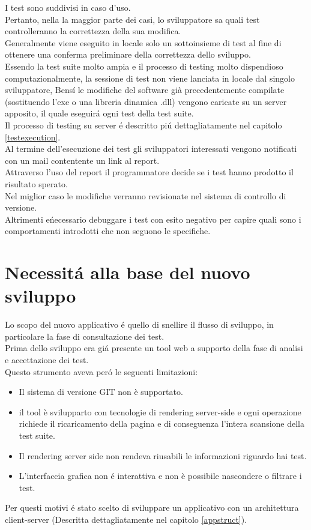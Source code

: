         I test sono suddivisi in caso d'uso.\\
        Pertanto, nella la maggior parte dei casi, lo sviluppatore sa quali test  controlleranno la correttezza della sua modifica.\\
        Generalmente viene eseguito in locale solo un sottoinsieme di test al fine di ottenere una conferma preliminare della correttezza dello sviluppo.\\

        Essendo la test suite molto ampia e il processo di testing molto dispendioso computazionalmente, 
        la sessione di test non viene lanciata in locale dal singolo sviluppatore, 
        Bens\'i  le modifiche del software già precedentemente compilate (sostituendo l’exe o una libreria dinamica .dll) 
        vengono caricate su un server apposito, il quale eseguir\'a ogni test della test suite.\\

        Il processo di testing su server \'e descritto pi\'u dettagliatamente nel capitolo \ref{testexecution}.\\
        
        Al termine dell'esecuzione dei test gli sviluppatori interessati vengono notificati con un mail contentente un link al report.\\
        Attraverso l'uso del report il programmatore decide se i test hanno prodotto il risultato sperato.\\
        Nel miglior caso le modifiche verranno revisionate nel sistema di controllo di versione.\\
        Altrimenti e\' necessario debuggare i test con esito negativo per capire quali sono i comportamenti introdotti che non seguono le specifiche. \\

    \section{Necessit\'a alla base del nuovo sviluppo}
        Lo scopo del nuovo applicativo \'e quello di snellire il flusso di sviluppo, in particolare la fase di consultazione dei test.\\

        Prima dello sviluppo era gi\'a presente un tool web a supporto della fase di analisi e accettazione dei test.\\
        Questo strumento aveva per\'o le seguenti limitazioni:\\
        \begin{itemize}
            \item Il sistema di versione GIT non è supportato.
            \item il tool è svilupparto con tecnologie di rendering server-side e ogni operazione richiede il ricaricamento della pagina e di conseguenza l'intera scansione della test suite.
            \item Il rendering server side non rendeva riusabili le informazioni riguardo hai test.
            \item L'interfaccia grafica non \'e interattiva e non è possibile nascondere o filtrare i test.
        \end{itemize}

        Per questi motivi \'e stato scelto di sviluppare un applicativo con un architettura client-server (Descritta dettagliatamente nel capitolo \ref{appstruct}).